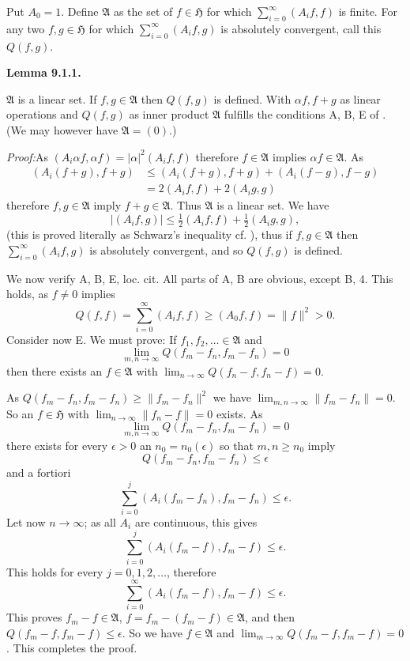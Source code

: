 \documentclass[12pt,b5paper,twoside]{article}
\newcommand{\Hspace}{\mathfrak H}
\newcommand{\Lemma}[1]{%
  \par\smallskip\noindent\phantomsection\label{lem:#1}\textbf{Lemma #1.}\enspace
}
\newcommand{\Proof}{\par\noindent\textit{Proof:}\enspace}
\begin{document}
Put $A_0=1$. Define $\mathfrak A$ as the set of $f\in\Hspace$ for which
$\sum_{i=0}^{\infty}(A_if,f)$ is finite. For any two $f,g\in\Hspace$ for
which $\sum_{i=0}^{\infty}(A_if,g)$ is absolutely convergent, call this
$Q(f,g)$.

\Lemma{9.1.1}
$\mathfrak A$ is a linear set. If $f,g\in\mathfrak A$ then $Q(f,g)$ is
defined. With $\alpha f,f+g$ as linear operations and $Q(f,g)$ as inner
product $\mathfrak A$ fulfills the conditions A, B, E of
\cite[pp.~64--66]{ref16}. (We may however have $\mathfrak A=(0)$.)

\Proof As $(A_i\alpha f,\alpha f)=|\alpha|^2(A_if,f)$ therefore
$f\in\mathfrak A$ implies $\alpha f\in\mathfrak A$. As
\begin{align*}
 (A_i(f+g),f+g)
 &\leq(A_i(f+g),f+g)+(A_i(f-g),f-g)\\
 &=2(A_if,f)+2(A_ig,g)
\end{align*}
therefore $f,g\in\mathfrak A$ imply $f+g\in\mathfrak A$. Thus
$\mathfrak A$ is a linear set. We have
\[
 |(A_if,g)|\leq\tfrac12(A_if,f)+\tfrac12(A_ig,g),
\]
(this is proved literally as Schwarz's inequality cf. \cite[p.~64]{ref16}),
thus if $f,g\in\mathfrak A$ then $\sum_{i=0}^{\infty}(A_if,g)$ is absolutely
convergent, and so $Q(f,g)$ is defined.

We now verify A, B, E, loc. cit. All parts of A, B are obvious, except B, 4.
This holds, as $f\ne0$ implies
\[
 Q(f,f)=\sum_{i=0}^{\infty}(A_if,f)\geq(A_0f,f)=\lVert f\rVert^2>0.
\]
Consider now E. We must prove: If $f_1,f_2,\ldots\in\mathfrak A$ and
\[
 \lim_{m,n\to\infty}Q(f_m-f_n,f_m-f_n)=0
\]
then there exists an $f\in\mathfrak A$ with
$\lim_{n\to\infty}Q(f_n-f,f_n-f)=0$.

As
$Q(f_m-f_n,f_m-f_n)\geq\lVert f_m-f_n\rVert^2$ we have
$\lim_{m,n\to\infty}\lVert f_m-f_n\rVert=0$. So an $f\in\Hspace$ with
$\lim_{n\to\infty}\lVert f_n-f\rVert=0$ exists. As
\[
 \lim_{m,n\to\infty}Q(f_m-f_n,f_m-f_n)=0
\]
there exists for every $\epsilon>0$ an $n_0=n_0(\epsilon)$ so that
$m,n\geq n_0$ imply
\[
 Q(f_m-f_n,f_m-f_n)\leq\epsilon
\]
and a fortiori
\[
 \sum_{i=0}^{j}(A_i(f_m-f_n),f_m-f_n)\leq\epsilon.
\]
Let now $n\to\infty$; as all $A_i$ are continuous, this gives
\[
 \sum_{i=0}^{j}(A_i(f_m-f),f_m-f)\leq\epsilon.
\]
This holds for every $j=0,1,2,\ldots$, therefore
\[
 \sum_{i=0}^{\infty}(A_i(f_m-f),f_m-f)\leq\epsilon.
\]
This proves $f_m-f\in\mathfrak A$,
$f=f_m-(f_m-f)\in\mathfrak A$, and then
$Q(f_m-f,f_m-f)\leq\epsilon$. So we have $f\in\mathfrak A$ and
$\lim_{m\to\infty}Q(f_m-f,f_m-f)=0$. This completes the proof.
\end{document}
